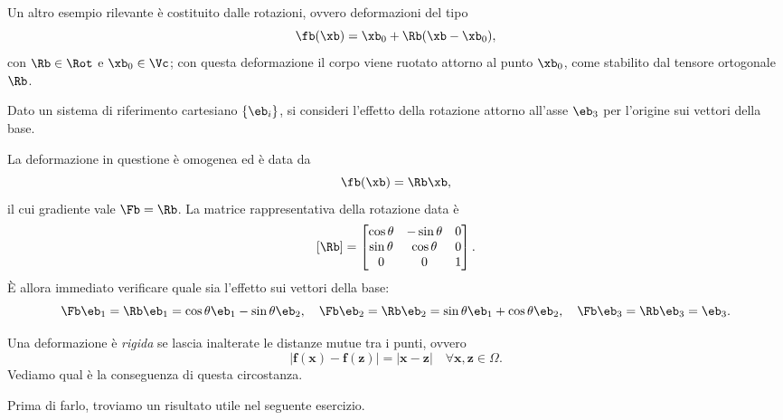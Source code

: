 Un altro esempio rilevante è costituito dalle rotazioni, ovvero deformazioni del tipo
\begin{equation}
	\fb(\xb)=\xb_0+\Rb(\xb-\xb_0),
\end{equation}
con $\Rb\in\Rot$ e $\xb_0\in\Vc$; con questa deformazione il corpo viene ruotato attorno al punto $\xb_0$, come stabilito dal tensore ortogonale $\Rb$.

\begin{exercise}
	Dato un sistema di riferimento cartesiano $\{\eb_i\}$, si consideri  l'effetto della rotazione attorno all'asse $\eb_3$ per l'origine sui vettori della base.
	
	\begin{svolgimento}
		La deformazione in questione è omogenea ed è data da
		\begin{equation}
			\fb(\xb)=\Rb\xb,
		\end{equation}
	il cui gradiente vale $\Fb=\Rb$. La matrice rappresentativa della rotazione data è
		\begin{equation}\label{Rp}
			[\Rb]=\begin{bmatrix}\cos\theta&-\sin\theta&0\\\sin\theta&\cos\theta&0\\0&0&1\end{bmatrix}.
		\end{equation}
È allora immediato verificare quale sia l'effetto sui vettori della base:
\begin{equation}
\Fb\eb_1=\Rb\eb_1=\cos\theta\eb_1-\sin\theta\eb_2, \quad \Fb\eb_2=\Rb\eb_2=\sin\theta\eb_1+\cos\theta\eb_2,  \quad 
\Fb\eb_3=\Rb\eb_3=\eb_3.
\end{equation}
	\end{svolgimento}
\end{exercise}

Una deformazione è \textit{rigida} se  lascia inalterate le distanze mutue tra i punti, ovvero
\begin{equation}\label{fxfz}
	|\mathbf{f}(\mathbf{x})-\mathbf{f}(\mathbf{z})|=|\mathbf{x}-\mathbf{z}|\quad\forall\mathbf{x},\mathbf{z}\in\Omega.
\end{equation}
Vediamo qual è la conseguenza di questa circostanza. 

Prima di farlo, troviamo  un risultato utile nel seguente esercizio.

